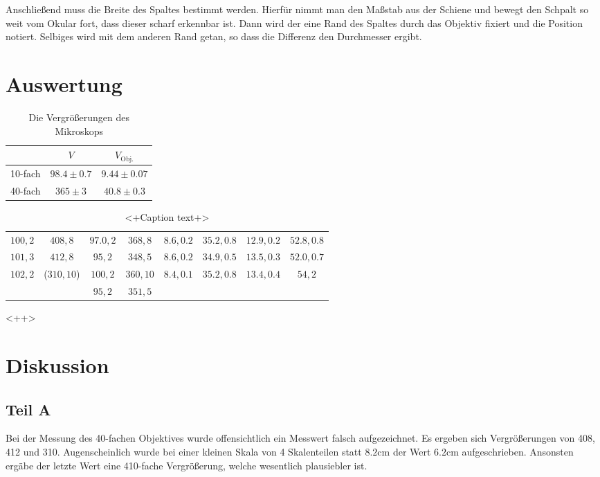 \documentclass[12pt,a4paper,titlepage,headinclude,bibtotoc]{scrartcl}
\begin{document}
Anschließend muss die Breite des Spaltes bestimmt werden.
Hierfür nimmt man den Maßstab aus der Schiene und bewegt den Schpalt so weit vom Okular fort, dass dieser scharf erkennbar ist.
Dann wird der eine Rand des Spaltes  durch das Objektiv fixiert und die Position notiert.
Selbiges wird mit dem anderen Rand getan, so dass die Differenz den Durchmesser ergibt.



\section{Auswertung}
\label{sec:auswertung}

\begin{table}
\centering
\begin{tabular}{|c||c|c|}
\hline
 & $V$ & $V_\text{Obj.}$\\\hline\hline
10-fach & $98.4\pm0.7$ & $9.44\pm0.07$\\\hline
40-fach & $365\pm 3$ & $40.8\pm 0.3$\\\hline
\end{tabular}
\caption{Die Vergrößerungen des Mikroskops}
\label{tab:vergr}
\end{table}
\begin{table}
\centering
\begin{tabular}{|c|c|c|c|c|c|c|c|}

$ 100, 2 $	&$408,8$	&$ 97.0, 2 $	&$ 368, 8 $	&$ 8.6, 0.2 $	&$ 35.2, 0.8 $	&$ 12.9, 0.2 $	&$ 52.8, 0.8 $	\\
$ 101, 3 $	&$412,8$	&$ 95, 2 $	&$ 348, 5 $	&$ 8.6, 0.2 $	&$ 34.9, 0.5 $	&$ 13.5, 0.3 $	&$ 52.0, 0.7 $	\\
$ 102, 2 $	&($310,10$)	&$ 100, 2 $	&$ 360, 10 $	&$ 8.4, 0.1 $	&$ 35.2, 0.8 $	&$ 13.4, 0.4 $	&$ 54, 2 $	\\
		&	&$ 95, 2 $	&$ 351, 5 $	&		&		&		&		\\



\end{tabular}
\caption{<+Caption text+>}
\label{tab:<+label+>}
\end{table}<++>

\section{Diskussion}
\label{sec:diskussion}
\subsection{Teil A}
Bei der Messung des 40-fachen Objektives wurde offensichtlich ein Messwert falsch aufgezeichnet.
Es ergeben sich Vergrößerungen von 408, 412 und 310.
Augenscheinlich wurde bei einer kleinen Skala von 4 Skalenteilen statt $8.2\si{\centi\metre}$ der Wert $6.2\si{\centi\metre}$ aufgeschrieben.
Ansonsten ergäbe der letzte Wert eine 410-fache Vergrößerung, welche wesentlich plausiebler ist.
\end{document}
